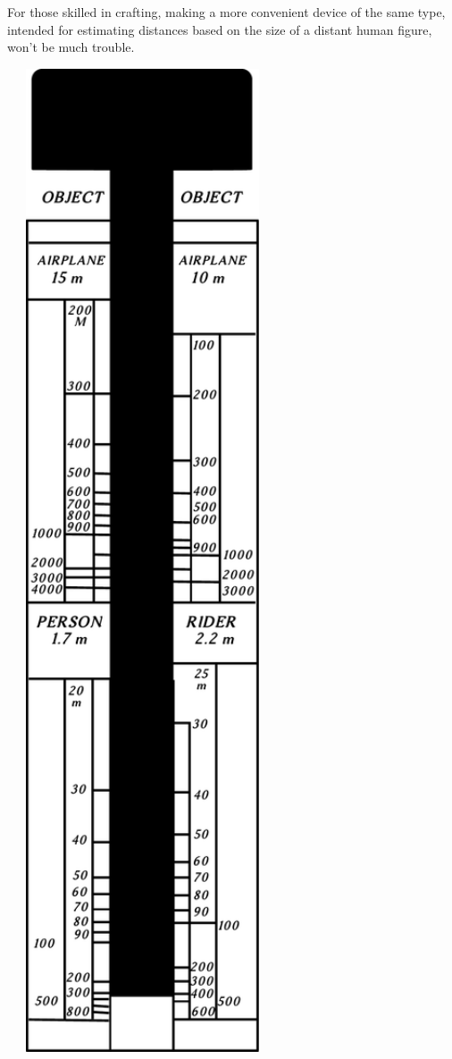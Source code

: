 For those skilled in crafting, making a more convenient device of the same type, intended for estimating distances based on the size of a distant human figure, won't be much trouble.

\begin{marginfigure}[-1cm]%
\centering
\includegraphics[width=0.6\textwidth]{figures/ch-02/fig-040.pdf}
\end{marginfigure}


